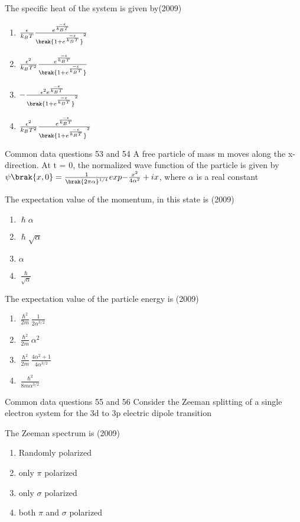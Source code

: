      \item [52.]  The specific heat of the system is given by\hfill (2009)
     \begin{enumerate}[label=(\Alph*)]
        \item $\frac{\epsilon}{k_BT}\frac{e^{\frac{-\epsilon}{k_BT}}}{\brak{1+e^{\frac{-\epsilon}{k_BT}}}^2}$
        \item $\frac{\epsilon^2}{k_BT^2}\frac{e^{\frac{-\epsilon}{k_BT}}}{\brak{1+e^{\frac{-\epsilon}{k_BT}}}}$
        \item $-\frac{\epsilon^2e^{\frac{-\epsilon}{k_BT}}}{\brak{1+e^{\frac{-\epsilon}{k_BT}}}^2}$
        \item  $\frac{\epsilon^2}{k_BT^2}\frac{e^{\frac{-\epsilon}{k_BT}}}{\brak{1+e^{\frac{-\epsilon}{k_BT}}}^2}$
     \end{enumerate}
     Common data questions 53 and 54
     A free particle of mass m moves along the x-direction. At t = 0, the normalized wave function of the particle is given by $\psi\brak{x,0}=\frac{1}{\brak{2\pi\alpha}^{1/4}}exp{-\frac{x^2}{4\alpha^2}+ix}$, where $\alpha$ is a real constant 
     \item[53.] The expectation value of the momentum, in this state is \hfill (2009)
     \begin{enumerate}[label=(\Alph*)]
        \item $\hslash \alpha$
        \item $\hslash \sqrt{\alpha}$
        \item $\alpha$
        \item $\frac{\hslash}{\sqrt{\alpha}}$
     \end{enumerate}
     \item[54.] The expectation value of the particle energy is \hfill (2009)
     \begin{enumerate}[label=(\Alph*)]
        \item $\frac{\hslash^2}{2m}\frac{1}{2\alpha^{3/2}}$
        \item $\frac{\hslash^2}{2m}\alpha^2$
        \item $\frac{\hslash^2}{2m}\frac{4\alpha^2+1}{4\alpha^{3/2}}$
         \item $\frac{\hslash^2}{8m\alpha^{3/2} }$
     \end{enumerate}
     Common data questions 55 and 56
     Consider the Zeeman splitting of a single electron system for the 3d to 3p electric dipole transition
     \item[55.] The Zeeman spectrum is \hfill (2009)
     \begin{enumerate}[label=(\Alph*)]
        
        \item Randomly polarized
        \item only $\pi$ polarized
        \item only $\sigma$ polarized
        \item both $\pi$ and $\sigma$ polarized
     \end{enumerate}

